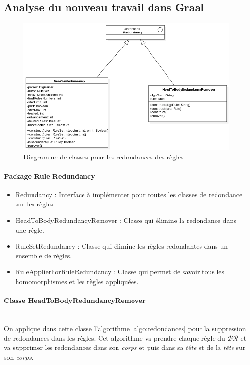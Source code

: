     \subsection{Analyse du nouveau travail dans Graal}
        \begin{figure}[H]
        \centering
        \includegraphics[width=\textwidth]{pictures/RedondanceDiagrammeClasse.png}
        \caption{Diagramme de classes pour les redondances des règles}
        \label{fig:dclasse}
        \end{figure}
        
    \paragraph{Package Rule Redundancy}
         \begin{itemize}
            \item Redundancy : Interface à implémenter pour toutes les classes de redondance sur les règles. 
            \item HeadToBodyRedundancyRemover : Classe qui élimine la redondance dans une règle.
            \item RuleSetRedundancy : Classe qui élimine les règles redondantes dans un ensemble de règles.
            \item RuleApplierForRuleRedundancy : Classe qui permet de savoir tous les homomorphismes et les règles appliquées.
        \end{itemize}
        
    \paragraph{Classe HeadToBodyRedundancyRemover}\ \\
         On applique dans cette classe l'algorithme \ref{algo:redondances} pour la suppression de redondances dans les règles. Cet algorithme va prendre chaque règle du $\mathcal{BR}$ et va supprimer les redondances dans son \textit{corps} et puis dans sa \textit{tête} et de la \textit{tête} sur son \textit{corps}.
         
